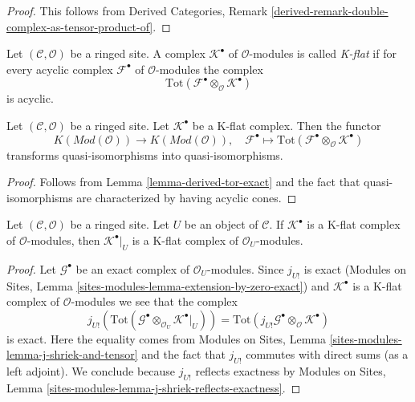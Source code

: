 \begin{proof}
This follows from Derived Categories, Remark
\ref{derived-remark-double-complex-as-tensor-product-of}.
\end{proof}

\begin{definition}
\label{definition-K-flat}
Let $(\mathcal{C}, \mathcal{O})$ be a ringed site.
A complex $\mathcal{K}^\bullet$ of $\mathcal{O}$-modules is
called {\it K-flat} if for every acyclic complex $\mathcal{F}^\bullet$
of $\mathcal{O}$-modules the complex
$$
\text{Tot}(\mathcal{F}^\bullet \otimes_\mathcal{O} \mathcal{K}^\bullet)
$$
is acyclic.
\end{definition}

\begin{lemma}
\label{lemma-K-flat-quasi-isomorphism}
Let $(\mathcal{C}, \mathcal{O})$ be a ringed site.
Let $\mathcal{K}^\bullet$ be a K-flat complex.
Then the functor
$$
K(\textit{Mod}(\mathcal{O}))
\longrightarrow
K(\textit{Mod}(\mathcal{O})), \quad
\mathcal{F}^\bullet
\longmapsto
\text{Tot}(\mathcal{F}^\bullet \otimes_\mathcal{O} \mathcal{K}^\bullet)
$$
transforms quasi-isomorphisms into quasi-isomorphisms.
\end{lemma}

\begin{proof}
Follows from
Lemma \ref{lemma-derived-tor-exact}
and the fact that quasi-isomorphisms are characterized by having
acyclic cones.
\end{proof}

\begin{lemma}
\label{lemma-restriction-K-flat}
Let $(\mathcal{C}, \mathcal{O})$ be a ringed site.
Let $U$ be an object of $\mathcal{C}$.
If $\mathcal{K}^\bullet$ is a K-flat complex of $\mathcal{O}$-modules, then
$\mathcal{K}^\bullet|_U$ is a K-flat complex of $\mathcal{O}_U$-modules.
\end{lemma}

\begin{proof}
Let $\mathcal{G}^\bullet$ be an exact complex of $\mathcal{O}_U$-modules.
Since $j_{U!}$ is exact
(Modules on Sites, Lemma \ref{sites-modules-lemma-extension-by-zero-exact})
and $\mathcal{K}^\bullet$ is a K-flat complex of $\mathcal{O}$-modules
we see that the complex
$$
j_{U!}(\text{Tot}(\mathcal{G}^\bullet \otimes_{\mathcal{O}_U}
\mathcal{K}^\bullet|_U)) =
\text{Tot}(j_{U!}\mathcal{G}^\bullet \otimes_\mathcal{O} \mathcal{K}^\bullet)
$$
is exact. Here the equality comes from
Modules on Sites, Lemma \ref{sites-modules-lemma-j-shriek-and-tensor}
and the fact that $j_{U!}$ commutes with direct sums (as a left adjoint).
We conclude because $j_{U!}$ reflects exactness by
Modules on Sites, Lemma \ref{sites-modules-lemma-j-shriek-reflects-exactness}.
\end{proof}

